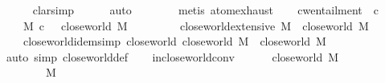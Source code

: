 \begin{isabellebody}
\ \ \ \ \isamarkupfalse%
\ clarsimp\isanewline
\ \ \ \ \isamarkupfalse%
\ {\isacharparenleft}{\kern0pt}auto\ {}\ {}{\isacharparenright}{\kern0pt}\isanewline
\ \ \ \ \isamarkupfalse%
\ {\isacharparenleft}{\kern0pt}metis\ atom{\isachardot}{\kern0pt}exhaust{\isacharparenright}{\kern0pt}%
\endisatagproof
{\isafoldproof}%
%
\isadelimproof
\isanewline
%
\endisadelimproof
\isanewline
\ \ \isamarkupfalse%
\ cw{\isacharunderscore}{\kern0pt}entailment\ {\isacharparenleft}{\kern0pt}\ {\isachardoublequoteopen}\isactrlsup c{\isasymTTurnstile}\isactrlsub {\isacharequal}{\kern0pt}{\isachardoublequoteclose}\ {}{}{\isacharparenright}{\kern0pt}\ \isanewline
\ \ \ \ {\isachardoublequoteopen}M\ \isactrlsup c{\isasymTTurnstile}\isactrlsub {\isacharequal}{\kern0pt}\ {\isasymphi}\ {\isasymequiv}\ close{\isacharunderscore}{\kern0pt}world\ M\ {\isasymTTurnstile}\ {\isasymphi}{\isachardoublequoteclose}\isanewline
\isanewline
\ \ \isamarkupfalse%
\isanewline
\ \ \ \ close{\isacharunderscore}{\kern0pt}world{\isacharunderscore}{\kern0pt}extensive{\isacharcolon}{\kern0pt}\ {\isachardoublequoteopen}M\ {\isasymsubseteq}\ close{\isacharunderscore}{\kern0pt}world\ M{\isachardoublequoteclose}\ \isanewline
\ \ \ \ close{\isacharunderscore}{\kern0pt}world{\isacharunderscore}{\kern0pt}idem{\isacharbrackleft}{\kern0pt}simp{\isacharbrackright}{\kern0pt}{\isacharcolon}{\kern0pt}\ {\isachardoublequoteopen}close{\isacharunderscore}{\kern0pt}world\ {\isacharparenleft}{\kern0pt}close{\isacharunderscore}{\kern0pt}world\ M{\isacharparenright}{\kern0pt}\ {\isacharequal}{\kern0pt}\ close{\isacharunderscore}{\kern0pt}world\ M{\isachardoublequoteclose}\isanewline
%
\isadelimproof
\ \ \ \ %
\endisadelimproof
%
\isatagproof
{}\isamarkupfalse%
\ {\isacharparenleft}{\kern0pt}auto\ simp{\isacharcolon}{\kern0pt}\ close{\isacharunderscore}{\kern0pt}world{\isacharunderscore}{\kern0pt}def{\isacharparenright}{\kern0pt}%
\endisatagproof
{\isafoldproof}%
%
\isadelimproof
\isanewline
%
\endisadelimproof
\isanewline
\ \ \isamarkupfalse%
\ in{\isacharunderscore}{\kern0pt}close{\isacharunderscore}{\kern0pt}world{\isacharunderscore}{\kern0pt}conv{\isacharcolon}{\kern0pt}\isanewline
\ \ \ \ {\isachardoublequoteopen}{\isasymphi}\ {\isasymin}\ close{\isacharunderscore}{\kern0pt}world\ M\ {\isasymlongleftrightarrow}\ {\isacharparenleft}{\kern0pt}\isanewline
\ \ \ \ \ \ \ \ {\isasymphi}{\isasymin}M\isanewline

\end{isabellebody}
